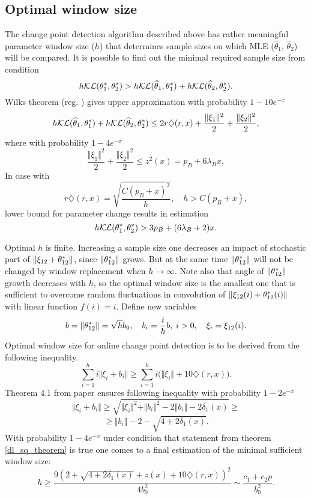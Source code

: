 \subsection{Optimal window size}
\label{subsec:win_size}
The change point detection algorithm described above has rather meaningful parameter window size ($h$) that determines sample sizes on which MLE ($\widehat{\theta}_1$, $\widehat{\theta}_2$) will be compared. It is possible to  find out the minimal required sample size from condition 
\[
h\mathcal{KL} (\theta_1^*, \theta_2^*) > h\mathcal{KL} (\widehat{\theta}_1, \theta_1^*) +
h\mathcal{KL} (\widehat{\theta}_2, \theta_2^*).
\]
Wilks theorem (reg. \cite{wilks2013}) gives upper approximation with probability $1-10e^{-x}$ 
\[
h \mathcal{KL} (\widehat{\theta}_1, \theta_1^*) +
h \mathcal{KL} (\widehat{\theta}_2, \theta_2^*) \leq 
2 r \diamondsuit(r,x) + \frac{\Vert \xi_1 \Vert^2}{2} + \frac{\Vert \xi_2 \Vert^2}{2},
\]
where with probability $1-4e^{-x}$
\[
\frac{\Vert \xi_1 \Vert^2}{2} + \frac{\Vert \xi_2 \Vert^2}{2} \leq z^2(x)  = p_B + 6 \lambda_B x,
\]
In case with 
\[
r \diamondsuit(r,x) = \sqrt{\frac{C(p_B + x)^3}{h}},
\quad h > C(p_B+x),
\]
lower bound for parameter change results in estimation
\[
h \mathcal{KL} (\theta_1^*, \theta_2^*) > 3 p_B + (6 \lambda_B + 2) x.
\]


Optimal $h$ is finite. Increasing a sample size one decreases an impact of stochastic part of $\Vert  \xi_{12} +  \theta_{12}^* \Vert$, since  $\Vert  \theta_{12}^* \Vert$ grows. But at the same time $\Vert  \theta_{12}^* \Vert$ will not be changed by window replacement when $h \to \infty$. Note also that angle of $\Vert  \theta_{12}^* \Vert$ growth decreases with $h$, so the optimal window size is the smallest one that is sufficient to overcome random fluctuations in convolution of $\Vert \xi_{12}(i) + \theta_{12}^*(i) \Vert$ with linear function $f(i) = i$.   
Define new variables
\[
b = \Vert  \theta_{12}^* \Vert = \sqrt{h} b_0,
\quad 
b_i = \frac{i}{h} b, \; i > 0,
\quad
\xi_i =  \xi_{12}(i).
\]
Optimal window size for online change point detection is to be derived from the following inequality.
\[
\sum_{i = 1}^{h} i \Vert \xi_i + b_i \Vert \geq \sum_{i = 1}^{h} i \bigg(\Vert \xi_i \Vert + 10 \diamondsuit(r,x) \bigg). 
\]
Theorem 4.1 from paper \cite{paqf2013} ensures following inequality with probability $1 - 2 e^{-x}$ 
\[
\Vert \xi_i + b_i \Vert \geq \sqrt{ \Vert \xi_i \Vert^2 + \Vert b_i \Vert^2  - 2 \Vert b_i \Vert - 2 \delta_1(x) } 
\geq 
\]
\[
\geq \Vert b_i \Vert - 2  - \sqrt{4 + 2 \delta_1(x)}.
\]
 With probability $1 - 4 e^{-x}$ under condition that statement from theorem \ref{dl_sq_theorem} is true one  comes to a final estimation of the minimal sufficient window size: 
\[
h \geq \frac{9 (2 + \sqrt{4 + 2 \delta_1(x)} + z(x) +  10 \diamondsuit(r,x) )^2 }{4 b_0^2} \sim \frac{c_1 + c_2 p}{b_0^2}. 
\]
